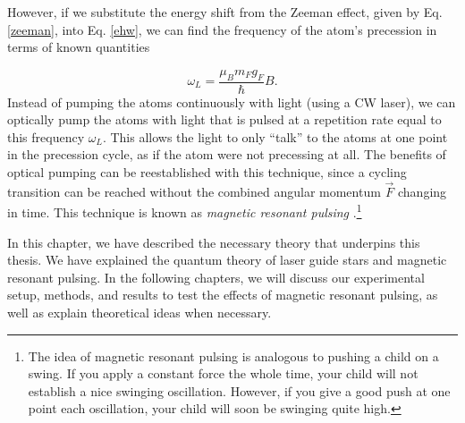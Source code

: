 

However, if we substitute the energy shift from the Zeeman effect, given by Eq. \ref{zeeman}, into Eq. \ref{ehw}, we can find the frequency of the atom's precession in terms of known quantities

\begin{equation}
	\omega_L = \frac{\mu_B m_F g_F}{\hbar} B.
  \label{zeemanf}
\end{equation}
%
Instead of pumping the atoms continuously with light (using a CW laser), we can optically pump the atoms with light that is pulsed at a repetition rate equal to this frequency $\omega_L$. This allows the light to only ``talk'' to the atoms at one point in the precession cycle, as if the atom were not precessing at all. The benefits of optical pumping can be reestablished with this technique, since a cycling transition can be reached without the combined angular momentum $\vec F$ changing in time. This technique is known as \textit{magnetic resonant pulsing} \cite{Kane2014}.\footnote{The idea of magnetic resonant pulsing is analogous to pushing a child on a swing. If you apply a constant force the whole time, your child will not establish a nice swinging oscillation. However, if you give a good push at one point each oscillation, your child will soon be swinging quite high.}


In this chapter, we have described the necessary theory that underpins this thesis. We have explained the quantum theory of laser guide stars and magnetic resonant pulsing. In the following chapters, we will discuss our experimental setup, methods, and results to test the effects of magnetic resonant pulsing, as well as explain theoretical ideas when necessary.
